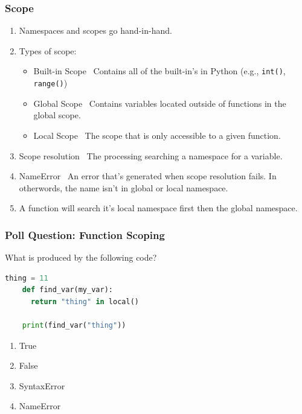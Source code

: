 \documentclass{beamer}
\begin{document}
%
%
\begin{frame}[fragile]
  \frametitle{Scope}
  \begin{enumerate}[A]
    \item Namespaces and scopes go hand-in-hand.
    \item Types of scope:
      \begin{itemize}
        \item Built-in Scope \textrightarrow \ Contains all of the built-in's in Python (e.g., \lstinline|int()|, \lstinline|range()|)
        \item Global Scope \textrightarrow \ Contains variables located outside of functions in the global scope.
        \item Local Scope \textrightarrow \ The scope that is only accessible to a given function.
      \end{itemize}
    \item Scope resolution \textrightarrow \ The processing searching a namespace for a variable.
    \item NameError \textrightarrow \ An error that's generated when scope resolution fails. In otherwords, the name isn't in global or local namespace.
    \item A function will search it's local namespace first then the global namespace.
  \end{enumerate}
\end{frame}

%
%
\begin{frame}[fragile]
  \frametitle{Poll Question: Function Scoping}
  \begin{minipage}{0.69\textwidth}
    What is produced by the following code?
    \begin{lstlisting}[language=Python, autogobble]
    thing = 11
    def find_var(my_var):
      return "thing" in local()

    print(find_var("thing"))
    \end{lstlisting}
  \end{minipage}
  \hfill
  \begin{minipage}{0.29\textwidth}
    \begin{enumerate}[A]
      \item True
      \item False
      \item SyntaxError
      \item NameError
    \end{enumerate}
  \end{minipage}
\end{frame}
\end{document}
